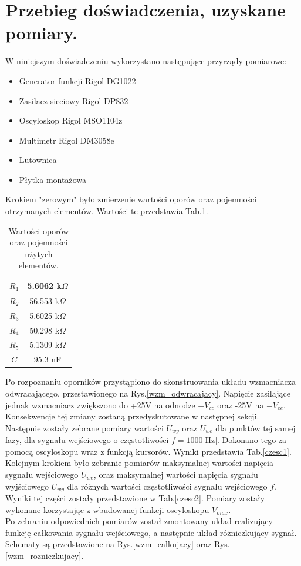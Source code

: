 \documentclass[11pt,a4paper]{article}
\begin{document}
\section*{Przebieg doświadczenia, uzyskane pomiary.}
W niniejszym doświadczeniu wykorzystano następujące przyrządy pomiarowe:
\begin{itemize}
\item{Generator funkcji Rigol DG1022}
\item{Zasilacz sieciowy Rigol DP832}
\item{Oscyloskop Rigol MSO1104z}
\item{Multimetr Rigol DM3058e}
\item{Lutownica}
\item{Płytka montażowa}
\end{itemize}
Krokiem "zerowym" było zmierzenie wartości oporów oraz pojemności otrzymanych elementów. Wartości te przedstawia Tab.\ref{opory}.

\begin{table}[!htp]
\begin{center}
\begin{tabular}{|c|c|}
\hline
$R_1$ & 5.6062 k$\Omega$ \\ \hline
$R_2$ & 56.553 k$\Omega$ \\ \hline
$R_3$ & 5.6025 k$\Omega$ \\ \hline
$R_4$ & 50.298 k$\Omega$ \\ \hline
$R_5$ & 5.1309 k$\Omega$ \\ \hline
$C$   & 95.3 nF          \\ \hline
\end{tabular}
\caption{Wartości oporów oraz pojemności użytych elementów.}
\label{opory}
\end{center}
\end{table}
Po rozpoznaniu oporników przystąpiono do skonstruowania układu wzmacniacza odwracającego, przestawionego na Rys.\ref{wzm_odwracajacy}. Napięcie zasilające jednak wzmacniacz zwiększono do +25V na odnodze $+V_{cc}$ oraz -25V na $-V_{ee}$.
Konsekwencje tej zmiany zostaną przedyskutowane w następnej sekcji. \\
Następnie zostały zebrane pomiary wartości $U_{wy}$ oraz $U_{we}$ dla punktów tej samej fazy, dla sygnału wejściowego o częstotliwości $f = 1000 \text{[Hz]}$. Dokonano tego za pomocą oscyloskopu wraz z funkcją kursorów. Wyniki przedstawia Tab.\ref{czesc1}. \\
Kolejnym krokiem było zebranie pomiarów maksymalnej wartości napięcia sygnału wejściowego $U_{we}$, oraz maksymalnej wartości napięcia sygnału wyjściowego $U_{wy}$ dla różnych wartości częstotliwości sygnału wejściowego $f$. Wyniki tej części zostały przedstawione w Tab.\ref{czesc2}. Pomiary zostały wykonane korzystając z wbudowanej funkcji oscyloskopu $V_{max}$. \\
Po zebraniu odpowiednich pomiarów został zmontowany układ realizujący funkcję całkowania sygnału wejściowego, a następnie układ różniczkujący sygnał. Schematy są przedstawione na Rys.\ref{wzm_calkujacy} oraz Rys.\ref{wzm_rozniczkujacy}.
\end{document}

